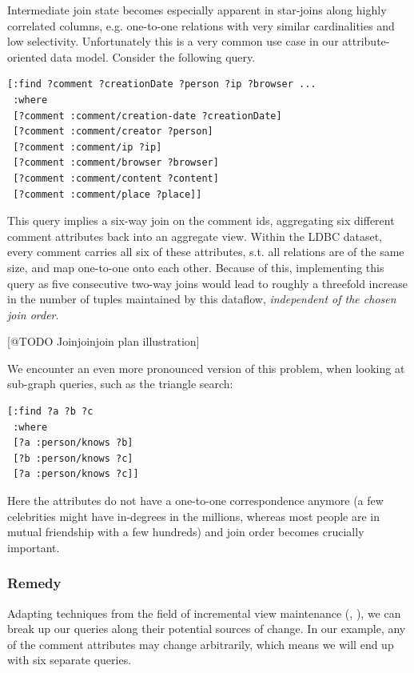 \documentclass[../catalog.tex]{subfiles}
\begin{document}
Intermediate join state becomes especially apparent in star-joins
along highly correlated columns, e.g. one-to-one relations with very
similar cardinalities and low selectivity. Unfortunately this is a
very common use case in our attribute-oriented data model. Consider
the following query.

\begin{verbatim}
[:find ?comment ?creationDate ?person ?ip ?browser ...
 :where
 [?comment :comment/creation-date ?creationDate]
 [?comment :comment/creator ?person]
 [?comment :comment/ip ?ip]
 [?comment :comment/browser ?browser]
 [?comment :comment/content ?content]
 [?comment :comment/place ?place]]
\end{verbatim}

This query implies a six-way join on the comment ids, aggregating six
different comment attributes back into an aggregate view. Within the
LDBC dataset, every comment carries all six of these attributes,
s.t. all relations are of the same size, and map one-to-one onto each
other. Because of this, implementing this query as five consecutive
two-way joins would lead to roughly a threefold increase in the number
of tuples maintained by this dataflow, \emph{independent of the chosen
  join order}.

[@TODO Joinjoinjoin plan illustration]

We encounter an even more pronounced version of this problem, when
looking at sub-graph queries, such as the triangle search:

\begin{verbatim}
[:find ?a ?b ?c
 :where
 [?a :person/knows ?b]
 [?b :person/knows ?c]
 [?a :person/knows ?c]]
\end{verbatim}

Here the attributes do not have a one-to-one correspondence anymore (a
few celebrities might have in-degrees in the millions, whereas most
people are in mutual friendship with a few hundreds) and join order
becomes crucially important.

\subsubsection{Remedy}

Adapting techniques from the field of incremental view maintenance
(\cite{gupta1993maintaining}, \cite{blakeley1986efficiently}), we can
break up our queries along their potential sources of change. In our
example, any of the comment attributes may change arbitrarily, which
means we will end up with six separate queries.
\end{document}

